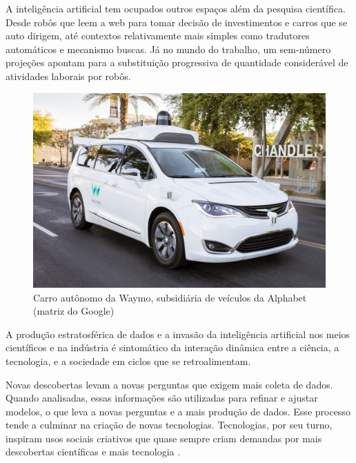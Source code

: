 A inteligência artificial tem ocupados outros espaços além da pesquisa científica. Desde robôs que leem a web para tomar decisão de investimentos \cite[]{Bloomberg} e carros que se auto dirigem, até contextos relativamente mais simples como tradutores automáticos e mecanismo buscas. Já no mundo do trabalho, um sem-número projeções apontam para a substituição progressiva de quantidade considerável de atividades laborais por robôs.


\begin{figure}[htb]
	\begin{center}
	    \includegraphics[scale=0.25]{imagens/waymo}
	\end{center}
	\caption{\label{Waymo} Carro autônomo da Waymo, subsidiária de veículos da Alphabet (matriz do Google)}
\end{figure}

A produção estratosférica de dados e a invasão da inteligência artificial nos meios científicos e na indústria é sintomático da interação dinâmica entre a ciência, a tecnologia, e a sociedade em ciclos que se retroalimentam.

Novas descobertas levam a novas perguntas que exigem mais coleta de dados. Quando analisadas, essas informações são utilizadas para refinar e ajustar modelos, o que leva a novas perguntas e a mais produção de dados. Esse processo tende a culminar na criação de novas tecnologias. Tecnologias, por seu turno, inspiram usos sociais criativos que quase sempre criam demandas por mais descobertas científicas e mais tecnologia \cite[]{wing2008}. 

